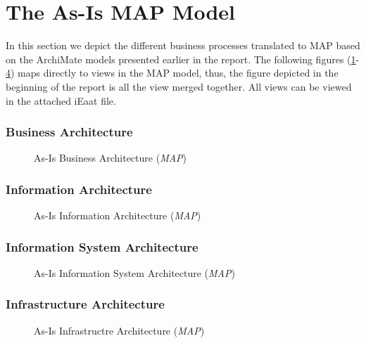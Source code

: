 \appendix
\section{The As-Is MAP Model}
\label{sec:as_is_map_model}
In this section we depict the different business processes translated to MAP based on the ArchiMate models presented earlier in the report. The following figures (\ref{fig:map_business_as_is}-\ref{fig:map_information_as_is}) maps directly to views in the MAP model, thus, the figure depicted in the beginning of the report is all the view merged together. All views can be viewed in the attached iEaat file.
%
\subsubsection{Business Architecture}
\begin{center}
	\begin{figure}[H]
		\centering
		\setlength\fboxsep{7pt}
		\setlength\fboxrule{0.5pt}
		\caption{As-Is Business Architecture (\emph{MAP})}
		\label{fig:map_business_as_is}
	\end{figure}
\end{center}
%
\subsubsection{Information Architecture}
\begin{center}
	\begin{figure}[H]
		\centering
		\setlength\fboxsep{7pt}
		\setlength\fboxrule{0.5pt}
		\caption{As-Is Information Architecture (\emph{MAP})}
		\label{fig:map_application_as_is}
	\end{figure}
\end{center}
%
\subsubsection{Information System Architecture}
\begin{center}
	\begin{figure}[H]
		\centering
		\setlength\fboxsep{7pt}
		\setlength\fboxrule{0.5pt}
		\caption{As-Is Information System Architecture (\emph{MAP})}
		\label{fig:map_information_as_is}
	\end{figure}
\end{center}
%
\subsubsection{Infrastructure Architecture}
\begin{center}
	\begin{figure}[H]
		\centering
		\setlength\fboxsep{7pt}
		\setlength\fboxrule{0.5pt}
		\caption{As-Is Infrastructre Architecture (\emph{MAP})}
		\label{fig:map_information_as_is}
	\end{figure}
\end{center}
